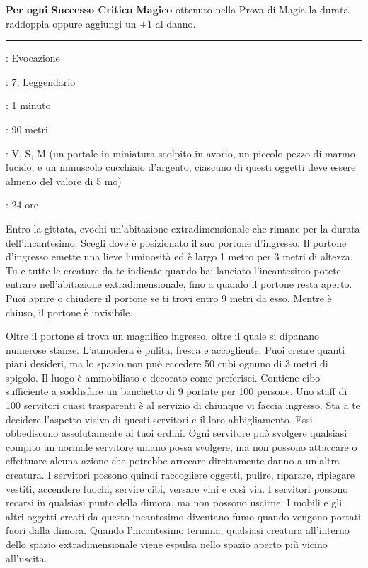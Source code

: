 \begin{multicols}{2}
\textbf{Per ogni Successo Critico Magico} ottenuto nella Prova di Magia la durata raddoppia oppure aggiungi un +1 al danno.

\smallskip\noindent\rule{\linewidth}{2pt} \hypertarget{Reggia Meravigliosa}{}\smallskip{}
\noindent
\begin{description}[noitemsep, topsep=0pt, parsep=0pt, partopsep=0pt, leftmargin=0cm, labelwidth=2.8cm]
	\item[\textbf{Lista di Magia}]: Evocazione
	\item[\textbf{Livello}]: 7, Leggendario
	\item[\textbf{T. di Lancio}]: 1 minuto
	\item[\textbf{Gittata}]: 90 metri
	\item[\textbf{Componenti}]: V, S, M (un portale in miniatura scolpito in avorio, un piccolo pezzo di marmo lucido, e un minuscolo cucchiaio d'argento, ciascuno di questi oggetti deve essere almeno del valore di 5 mo)
	\item[\textbf{Durata}]: 24 ore
\end{description}

Entro la gittata, evochi un'abitazione extradimensionale che rimane per la durata dell'incantesimo. Scegli dove è posizionato il suo portone d'ingresso. Il portone d'ingresso emette una lieve luminosità ed è largo 1 metro per 3 metri di altezza. Tu e tutte le creature da te indicate quando hai lanciato l'incantesimo potete entrare nell'abitazione extradimensionale, fino a quando il portone resta aperto. Puoi aprire o chiudere il portone se ti trovi entro 9 metri da esso. Mentre è chiuso, il portone è invisibile.

Oltre il portone si trova un magnifico ingresso, oltre il quale si dipanano numerose stanze. L'atmosfera è pulita, fresca e accogliente. Puoi creare quanti piani desideri, ma lo spazio non può eccedere 50 cubi ognuno di 3 metri di spigolo. Il luogo è ammobiliato e decorato come preferisci. Contiene cibo sufficiente a soddisfare un banchetto di 9 portate per 100 persone. Uno staff di 100 servitori quasi trasparenti è al servizio di chiunque vi faccia ingresso. Sta a te decidere l'aspetto visivo di questi servitori e il loro abbigliamento. Essi obbediscono assolutamente ai tuoi ordini. Ogni servitore può svolgere qualsiasi compito un normale servitore umano possa svolgere, ma non possono attaccare o effettuare alcuna azione che potrebbe arrecare direttamente danno a un'altra creatura. I servitori possono quindi raccogliere oggetti, pulire, riparare, ripiegare vestiti, accendere fuochi, servire cibi, versare vini e così via. I servitori possono recarsi in qualsiasi punto della dimora, ma non possono uscirne. I mobili e gli altri oggetti creati da questo incantesimo diventano fumo quando vengono portati fuori dalla dimora. Quando l'incantesimo termina, qualsiasi creatura all'interno dello spazio extradimensionale viene espulsa nello spazio aperto più vicino all'uscita.


\end{multicols}
